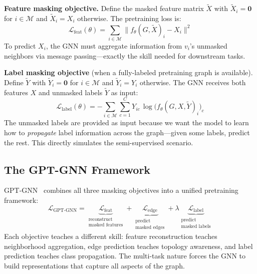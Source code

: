 \begin{notechapter}
\textbf{Feature masking objective.} Define the masked feature matrix
$\tilde{X}$ with $\tilde{X}_i = \mathbf{0}$ for $i \in \mathcal{M}$ and
$\tilde{X}_i = X_i$ otherwise. The pretraining loss is:
\begin{equation}
\label{semi-supervised-graphs:eq:feature_mask}
\mathcal{L}_{\text{feat}}(\theta) = \sum_{i \in \mathcal{M}}
  \|f_\theta(G, \tilde{X})_i - X_i\|^2
\end{equation}
To predict $X_i$, the GNN must aggregate information from $v_i$'s unmasked
neighbors via message passing---exactly the skill needed for downstream tasks.

\textbf{Label masking objective} (when a fully-labeled pretraining graph is
available). Define $\tilde{Y}$ with $\tilde{Y}_i = \mathbf{0}$ for
$i \in \mathcal{M}$ and $\tilde{Y}_i = Y_i$ otherwise. The GNN receives
both features $X$ and unmasked labels $\tilde{Y}$ as input:
\begin{equation}
\label{semi-supervised-graphs:eq:label_mask}
\mathcal{L}_{\text{label}}(\theta) = -\sum_{i \in \mathcal{M}} \sum_{c=1}^C
  Y_{ic}\,\log\bigl(f_\theta(G, X, \tilde{Y})_i\bigr)_c
\end{equation}
The unmasked labels are provided as input because we want the model to learn
how to \emph{propagate} label information across the graph---given some labels,
predict the rest. This directly simulates the semi-supervised scenario.

\subsection{The GPT-GNN Framework}

GPT-GNN~\cite{semi-supervised-graphs:hu2020} combines all three masking objectives into a unified
pretraining framework:
\begin{equation}
\mathcal{L}_{\text{GPT-GNN}} =
  \underbrace{\mathcal{L}_{\text{feat}}}_{\substack{\text{reconstruct}\\\text{masked features}}}
  + \underbrace{\mathcal{L}_{\text{edge}}}_{\substack{\text{predict}\\\text{masked edges}}}
  + \lambda\underbrace{\mathcal{L}_{\text{label}}}_{\substack{\text{predict}\\\text{masked labels}}}
\end{equation}
Each objective teaches a different skill: feature reconstruction teaches
neighborhood aggregation, edge prediction teaches topology awareness, and
label prediction teaches class propagation. The multi-task nature forces the
GNN to build representations that capture all aspects of the graph.


\end{notechapter}
